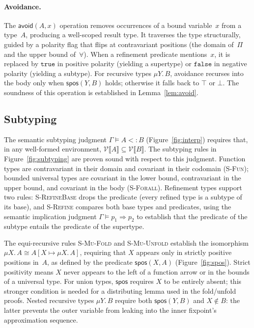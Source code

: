 \documentclass[acmsmall]{acmart}
\begin{document}
\paragraph{Avoidance.}
The $\textsf{avoid}(A, x)$ operation removes occurrences of a bound variable~$x$ from a type~$A$, producing a well-scoped result type. It traverses the type structurally, guided by a polarity flag that flips at contravariant positions (the domain of~$\Pi$ and the upper bound of~$\forall$). When a refinement predicate mentions~$x$, it is replaced by $\texttt{true}$ in positive polarity (yielding a supertype) or $\texttt{false}$ in negative polarity (yielding a subtype). For recursive types $\mu Y.\, B$, avoidance recurses into the body only when $\textsf{spos}(Y, B)$ holds; otherwise it falls back to $\top$ or $\bot$. The soundness of this operation is established in Lemma~\ref{lem:avoid}.



\subsection{Subtyping}\label{sec:subtyping}

The semantic subtyping judgment $\Gamma \vDash A <: B$ (Figure~\ref{fig:interp}) requires that, in any well-formed environment, $\mathcal{V}\llbracket A \rrbracket \subseteq \mathcal{V}\llbracket B \rrbracket$.
The subtyping rules in Figure~\ref{fig:subtyping} are proven sound with respect to this judgment. Function types are contravariant in their domain and covariant in their codomain (\textsc{S-Fun}); bounded universal types are covariant in the lower bound, contravariant in the upper bound, and covariant in the body (\textsc{S-Forall}). Refinement types support two rules: \textsc{S-RefineBase} drops the predicate (every refined type is a subtype of its base), and \textsc{S-Refine} compares both base types and predicates, using the semantic implication judgment $\Gamma \vDash p_1 \Rightarrow p_2$ to establish that the predicate of the subtype entails the predicate of the supertype.

The equi-recursive rules \textsc{S-Mu-Fold} and \textsc{S-Mu-Unfold} establish the isomorphism $\mu X.\, A \cong A[X \mapsto \mu X.\, A]$, requiring that $X$ appears only in strictly positive positions in~$A$, as defined by the predicate $\textsf{spos}(X, A)$ (Figure~\ref{fig:spos}). Strict positivity means $X$ never appears to the left of a function arrow or in the bounds of a universal type. For union types, $\textsf{spos}$ requires $X$ to be entirely absent; this stronger condition is needed for a distributing lemma used in the fold/unfold proofs. Nested recursive types $\mu Y.\, B$ require both $\textsf{spos}(Y, B)$ and $X \notin B$: the latter prevents the outer variable from leaking into the inner fixpoint's approximation sequence.
\end{document}
